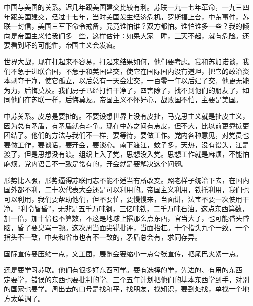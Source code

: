 中国与美国的关系。迟几年跟美国建交比较有利。苏联一九一七年革命，一九三四年跟美国建交，经过十七年，当时美国发生经济危机，罗斯福上台，中东事件，苏联一封信，美国三军下命令戒备，究竟谁怕谁？双方都怕。谁怕谁多一些？我的倾向是帝国主义怕我们多一些，这样估计：如果大家一睡，三天不起，就有危险。还要看到坏的可能性，帝国主义会发疯。

世界大战，现在打起来不容易，打起来结果如何，他们要考虑。我和苏加诺谈，我们不急于进联合国，不急于和美国建交，使它在国际国内没有道理，把它的政治资本剥夺干净，使它孤立，以后总有一天会建交，一百零一年以后建了交，他更无能为力，后悔莫及。我们房子已经打扫干净了，四害除了，找不到他们的朋友了，如同他们在苏联一样，后悔莫及。帝国主义不怀好心，战败国不怕，主要是美国。

中苏关系。皮总是要扯的。不要设想世界上没有皮扯，马克思主义就是扯皮主义，因为总有矛盾，有矛盾就有斗争。现在中苏之间有点皮，但不大，比以前更靠拢更团结了。他们的方法与我们不一样，要等待，要做工作。党内各种意见，对党员也要做工作，要谈话，要开会，要谈心。南下渡江，蚊子多，天热，没有馒头，江是渡了，但是思想没有渡。组织上入了党，思想没入党。思想工作就是麻烦，不能怕麻烦。党内语言不一致是常有的，开会就是要解决这个问题。

形势比人强，形势逼得苏联同志不能不适当有所改变。照老样子统治下去，在国内国外都不利，二十次代表大会还是可以利用的。帝国主义利用，铁托利用，我们也可以利用，我们要帮助他们，但不要忙，要慢慢来，当面讲，法宝不要一次使用干净。“利令智昏”，无非是五千万吨钢，三亿吨铁，二千万吨石油。这点东西算数，加一倍，加十倍也不算数，不这是地球上撂那么点东西，官当大了，也可能昏头昏脑，昏了要臭骂一顿。这次周当面尖锐批评，当面抬杠。十个指头九个一致，一个指头不一致，中央和省市也有不一致的，矛盾总会有，求同存异。

国际宣传要压缩一点，文工团，展览会要缩小一点夸张宣传，把尾巴夹紧一点。

还是要学习苏联。他们有很多好东西可学。要有选择的学，先进的、有用的东西一定要学，错误的东西也要批判的学。三个五年计划把他们的基本东西学到手，对别的国家也要学。周出去的口号是找和平，找朋友，找知识，要到处找，单找一个地方太单调了。

